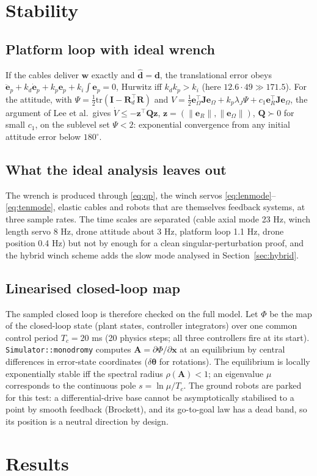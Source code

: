 \documentclass[11pt,a4paper]{article}
\newcommand{\T}{^{\!\top}}
\newcommand{\e}{\bm{e}}
\begin{document}
\section{Stability}\label{sec:stab}
\subsection{Platform loop with ideal wrench}
If the cables deliver $\bm w$ exactly and $\hat{\bm d}=\bm d$, the translational error obeys
$\ddot{\e}_p+k_d\dot{\e}_p+k_p\e_p+k_i\!\int\!\e_p=0$, Hurwitz iff $k_dk_p>k_i$ (here $12.6\cdot49\gg171.5$). For the
attitude, with $\Psi=\tfrac12\mathrm{tr}(\bm I-\bm R_d\T\bm R)$ and
$V=\tfrac12\e_\Omega\T\bm J\e_\Omega+k_p\lambda_J\Psi+c_1\e_R\T\bm J\e_\Omega$, the argument of Lee et al.\ gives
$\dot V\le-\bm z\T\bm Q\bm z$, $\bm z=(\|\e_R\|,\|\e_\Omega\|)$, $\bm Q\succ0$ for small $c_1$, on the sublevel set
$\Psi<2$: exponential convergence from any initial attitude error below $180^\circ$.
\subsection{What the ideal analysis leaves out}
The wrench is produced through \eqref{eq:qp}, the winch servos \eqref{eq:lenmode}--\eqref{eq:tenmode}, elastic
cables and robots that are themselves feedback systems, at three sample rates. The time scales are separated
(cable axial mode 23 Hz, winch length servo 8 Hz, drone attitude about 3 Hz, platform loop 1.1 Hz, drone position
0.4 Hz) but not by enough for a clean singular-perturbation proof, and the hybrid winch scheme adds the slow mode
analysed in Section~\ref{sec:hybrid}.
\subsection{Linearised closed-loop map}
The sampled closed loop is therefore checked on the full model. Let $\Phi$ be the map of the closed-loop state
(plant states, controller integrators) over one common control period $T_c=20$ ms (20 physics steps; all three
controllers fire at its start). \texttt{Simulator::monodromy} computes $\bm A=\partial\Phi/\partial\bm x$ at an
equilibrium by central differences in error-state coordinates ($\delta\bm\theta$ for rotations). The
equilibrium is locally exponentially stable iff the spectral radius $\rho(\bm A)<1$; an eigenvalue $\mu$
corresponds to the continuous pole $s=\ln\mu/T_c$. The ground robots are parked for this test: a
differential-drive base cannot be asymptotically stabilised to a point by smooth feedback (Brockett), and its
go-to-goal law has a dead band, so its position is a neutral direction by design.

\section{Results}\label{sec:results}

\end{document}
